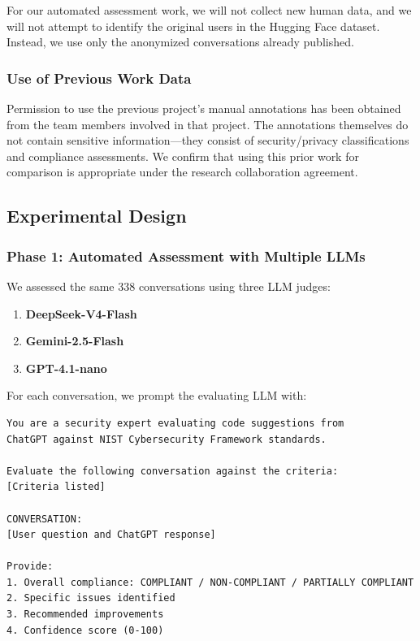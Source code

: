 \documentclass[12pt]{article}
\begin{document}
For our automated assessment work, we will not collect new human data, and we will not attempt to identify the original users in the Hugging Face dataset. Instead, we use only the anonymized conversations already published.
 
\subsubsection{Use of Previous Work Data}
 
Permission to use the previous project's manual annotations has been obtained from the team members involved in that project. The annotations themselves do not contain sensitive information—they consist of security/privacy classifications and compliance assessments. We confirm that using this prior work for comparison is appropriate under the research collaboration agreement.
 

 
\subsection{Experimental Design}
 
\subsubsection{Phase 1: Automated Assessment with Multiple LLMs}
 
We assessed the same 338 conversations using three LLM judges:

\begin{enumerate}
    \item \textbf{DeepSeek-V4-Flash}
    \item \textbf{Gemini-2.5-Flash}
    \item \textbf{GPT-4.1-nano}
\end{enumerate}
 
For each conversation, we prompt the evaluating LLM with:
\begin{lstlisting}
You are a security expert evaluating code suggestions from 
ChatGPT against NIST Cybersecurity Framework standards.
 
Evaluate the following conversation against the criteria:
[Criteria listed]
 
CONVERSATION:
[User question and ChatGPT response]
 
Provide:
1. Overall compliance: COMPLIANT / NON-COMPLIANT / PARTIALLY COMPLIANT
2. Specific issues identified
3. Recommended improvements
4. Confidence score (0-100)
\end{lstlisting}
 
\end{document}
